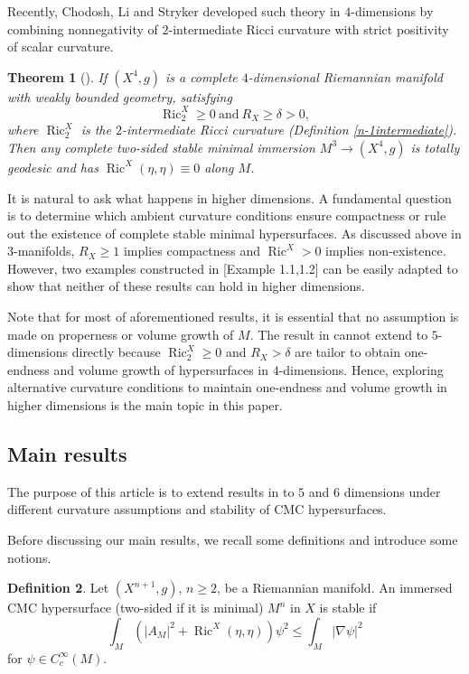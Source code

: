 \documentclass[11pt,letterpaper]{amsart}
\DeclareMathOperator{\Ric}{Ric}
\newtheorem{theorem}{Theorem}[section]
\theoremstyle{definition}
\newtheorem{definition}[theorem]{Definition}
\theoremstyle{remark}
\numberwithin{equation}{section}
\begin{document}
Recently, Chodosh, Li and Stryker developed such theory in $4$-dimensions by combining nonnegativity of $2$-intermediate Ricci curvature with strict positivity of scalar curvature. 

\begin{theorem}[\cite{chodosh-li-stryker}]
 If $(X^4,g)$ is a complete $4$-dimensional Riemannian manifold with weakly bounded geometry, satisfying
    \[\operatorname{Ric}^X_2\geq 0\  \text{and}\ R_X\geq \delta>0, \]
where $\Ric_2^X$ is the $2$-intermediate Ricci curvature (Definition \ref{n-1intermediate}). Then any complete two-sided stable minimal immersion $M^3\rightarrow (X^4,g)$ is totally geodesic and has $\operatorname{Ric}^X(\eta,\eta)\equiv 0$ along $M$.
    
\end{theorem}

It is natural to ask what happens in higher dimensions. A fundamental question is to determine which ambient curvature conditions ensure compactness or rule out the existence of complete stable minimal hypersurfaces. As discussed above in $3$-manifolds, $R_X\geq 1$ implies compactness and $\Ric^X>0$ implies non-existence. However, two examples constructed in \cite{chodosh-li-stryker}[Example 1.1,1.2] can be easily adapted to show that neither of these results can hold in higher dimensions. 

Note that for most of aforementioned results, it is essential that no assumption is made on properness or volume growth of $M$. The result in \cite{chodosh-li-stryker} cannot extend to $5$-dimensions directly because $\Ric^X_2\geq 0$ and $R_X>\delta$ are tailor to obtain one-endness and volume growth of hypersurfaces in $4$-dimensions. Hence, exploring alternative curvature conditions to maintain one-endness and volume growth in higher dimensions is the main topic in this paper.


\subsection{Main results}
The purpose of this article is to extend results in \cite{chodosh-li-stryker} to $5$ and $6$ dimensions under different curvature assumptions and stability of CMC hypersurfaces. 

Before discussing our main results, we recall some definitions and introduce some notions.

\begin{definition}\label{weakstabilitydefinition}
    Let $(X^{n+1},g)$, $n\geq 2$, be a  Riemannian manifold. An immersed CMC hypersurface (two-sided if it is minimal) $M^n$ in $X$ is  stable if $$\int_M \left(|A_M|^2+\Ric^X(\eta,\eta)\right)\psi^2\leq \int_M |\nabla \psi|^2$$
    for $\psi\in C_c^\infty(M)$. 
    
\end{definition}
\end{document}
